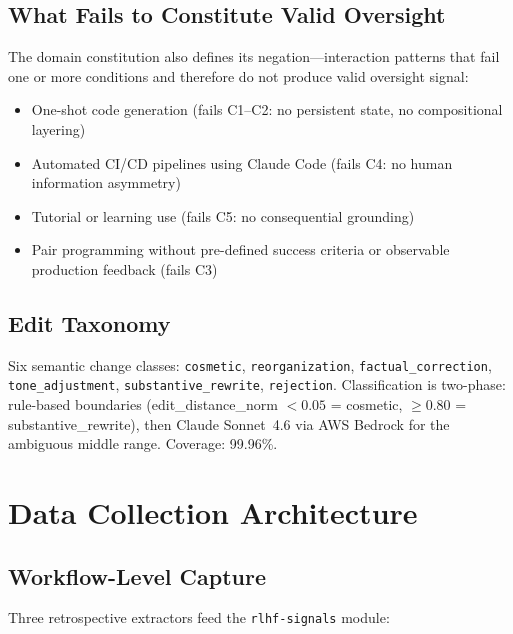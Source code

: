 \documentclass[11pt]{article}
\begin{document}
\subsection{What Fails to Constitute Valid Oversight}
\label{sec:invalid-oversight}

The domain constitution also defines its negation---interaction patterns that fail one or more conditions and therefore do not produce valid oversight signal:

\begin{itemize}[nosep]
  \item One-shot code generation (fails C1--C2: no persistent state, no compositional layering)
  \item Automated CI/CD pipelines using Claude Code (fails C4: no human information asymmetry)
  \item Tutorial or learning use (fails C5: no consequential grounding)
  \item Pair programming without pre-defined success criteria or observable production feedback (fails C3)
\end{itemize}

\subsection{Edit Taxonomy}
\label{sec:edit-taxonomy}

Six semantic change classes: \texttt{cosmetic}, \texttt{reorganization}, \texttt{factual\_correction}, \texttt{tone\_adjustment}, \texttt{substantive\_rewrite}, \texttt{rejection}.
Classification is two-phase: rule-based boundaries (edit\_distance\_norm $<0.05$ = cosmetic, $\geq 0.80$ = substantive\_rewrite), then Claude Sonnet~4.6 via AWS Bedrock for the ambiguous middle range.
Coverage: 99.96\%.


\section{Data Collection Architecture}
\label{sec:data-collection}

\subsection{Workflow-Level Capture}
\label{sec:workflow-capture}

Three retrospective extractors feed the \texttt{rlhf-signals} module:
\end{document}
